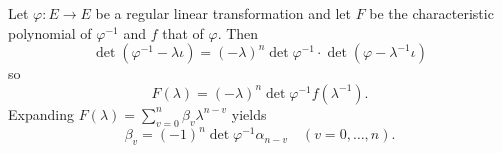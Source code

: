Let $\varphi: E \to E$ be a regular linear transformation and let $F$ be the characteristic polynomial of $\varphi^{-1}$ and $f$ that of $\varphi$. Then
$$\det(\varphi^{-1} - \lambda \iota) = (-\lambda)^n \det \varphi^{-1} \cdot \det(\varphi - \lambda^{-1} \iota)$$
so
$$F(\lambda) = (-\lambda)^n \det \varphi^{-1} f(\lambda^{-1}).$$
Expanding $F(\lambda) = \sum_{v=0}^{n} \beta_v \lambda^{n-v}$ yields
$$\beta_v = (-1)^n \det \varphi^{-1} \alpha_{n-v} \quad (v = 0, \ldots, n).$$
